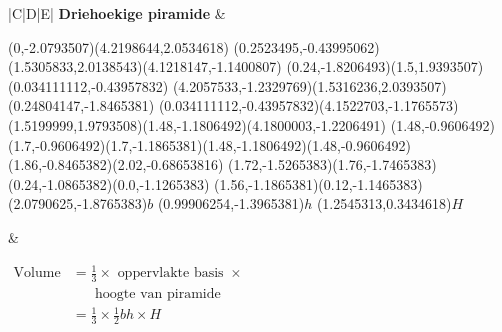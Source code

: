 \begin{table}[H]
\begin{tabular}{|C|D|E|}
\textbf{Driehoekige piramide} &
\begin{center}
\scalebox{0.8} %
{
\begin{pspicture}(0,-2.0793507)(4.2198644,2.0534618)
\pspolygon[linewidth=0.028222222,fillstyle=solid](0.2523495,-0.43995062)(1.5305833,2.0138543)(4.1218147,-1.1400807)
\pspolygon[linewidth=0.028222222,fillstyle=solid](0.24,-1.8206493)(1.5,1.9393507)(0.034111112,-0.43957832)
\pspolygon[linewidth=0.028222222,fillstyle=solid](4.2057533,-1.2329769)(1.5316236,2.0393507)(0.24804147,-1.8465381)
\psline[linewidth=0.022cm,linestyle=dashed,dash=0.16cm 0.16cm](0.034111112,-0.43957832)(4.1522703,-1.1765573)
\psline[linewidth=0.024,linestyle=dotted,dotsep=0.16cm](1.5199999,1.9793508)(1.48,-1.1806492)(4.1800003,-1.2206491)
\psline[linewidth=0.02](1.48,-0.9606492)(1.7,-0.9606492)(1.7,-1.1865381)(1.48,-1.1806492)(1.48,-0.9606492)
\psline[linewidth=0.04cm](1.86,-0.8465382)(2.02,-0.68653816)
\psline[linewidth=0.04cm](1.72,-1.5265383)(1.76,-1.7465383)
\psline[linewidth=0.04cm](0.24,-1.0865382)(0.0,-1.1265383)
\psline[linewidth=0.024cm,linestyle=dotted,dotsep=0.16cm](1.56,-1.1865381)(0.12,-1.1465383)
\rput(2.0790625,-1.8765383){$b$}
\rput(0.99906254,-1.3965381){$h$}
\rput(1.2545313,0.3434618){$H$}
\end{pspicture} 
}
\end{center}
&

$\begin{aligned}
\mbox{Volume} &= \frac{1}{3} \times \mbox{ oppervlakte basis } \times \\
&~~~~~~\mbox{ hoogte van piramide }\\
&=\frac{1}{3} \times \frac{1}{2}bh \times H
 \end{aligned}$
 \\ \hline

\end{tabular}
\end{table}

